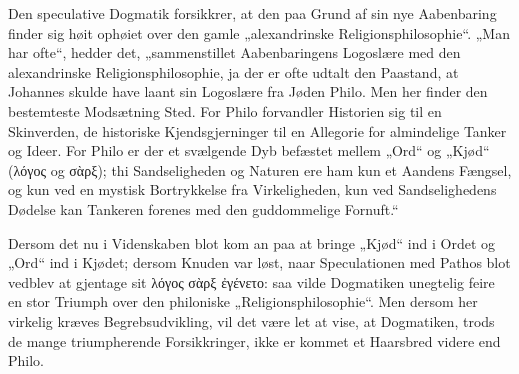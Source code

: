 \documentclass[12pt]{book}
\newcommand{\opage}[1]{\marginnote{\footnotesize\textit{[#1]}}}
\begin{document}
Den speculative Dogmatik forsikkrer, at den paa Grund
af sin nye Aabenbaring finder sig høit ophøiet over den gamle
„alexandrinske Religionsphilosophie“. „Man har ofte“, hedder
det, „sammenstillet Aabenbaringens Logoslære med den alexandrinske
Religionsphilosophie, ja der er ofte udtalt den Paastand,
at Johannes skulde have laant sin Logoslære fra Jøden
Philo. Men her finder den bestemteste Modsætning Sted.
For Philo forvandler Historien sig til en Skinverden, de
historiske Kjendsgjerninger til en Allegorie for almindelige
Tanker og Ideer. For Philo er der et svælgende Dyb befæstet
mellem „Ord“ og „Kjød“ (λόγος og σὰρξ); thi Sandseligheden
og Naturen ere ham kun et Aandens Fængsel, og
\opage{91}kun ved en mystisk Bortrykkelse fra Virkeligheden, kun ved
Sandselighedens Dødelse kan Tankeren forenes med den guddommelige Fornuft.“

Dersom det nu i Videnskaben blot kom an paa at bringe
„Kjød“ ind i Ordet og „Ord“ ind i Kjødet; dersom Knuden
var løst, naar Speculationen med Pathos blot vedblev at
gjentage sit λόγος σὰρξ ἐγένετο: saa vilde Dogmatiken
unegtelig feire en stor Triumph over den philoniske „Religionsphilosophie“.
Men dersom her virkelig kræves Begrebsudvikling,
vil det være let at vise, at Dogmatiken, trods de
mange triumpherende Forsikkringer, ikke er kommet et Haarsbred
videre end Philo.
\end{document}
